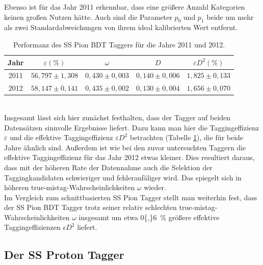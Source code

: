 Ebenso ist für das Jahr \num{2011} erkennbar, dass eine größere Anzahl Kategorien keinen großen Nutzen hätte. Auch sind die Parameter $p_0$ und $p_1$ beide um mehr als zwei Standardabweichungen von ihrem ideal kalibrierten Wert entfernt.
\begin{table}[htbp]
	\centering
	\caption{Performanz des SS Pion BDT Taggers für die Jahre \num{2011} und \num{2012}.}
	\label{tab:performance_SSPionBDT}
	\begin{tabular}{ccccc}
	\toprule
      Jahr & $\varepsilon(\%)$ & $\omega$ & $D$ & $\varepsilon D^2(\%)$ \\ 
      \midrule
      2011 & $56{,}797\pm1{,}308$& $0{,}430\pm0{,}003$ & $0{,}140\pm0{,}006$ & $1{,}825\pm0{,}133$\\ 
      2012 & $58{,}147\pm0{,}141$& $0{,}435\pm0{,}002$ & $0{,}130\pm0{,}004$ & $1{,}656\pm0{,}070$\\ 
      \bottomrule
	\end{tabular}
\end{table}\\
Insgesamt lässt sich hier zunächst festhalten, dass der Tagger auf beiden Datensätzen sinnvolle Ergebnisse liefert. Dazu kann man hier die Taggingeffizienz $\varepsilon$ und die effektive Taggingeffizienz $\varepsilon D^2$ betrachten (Tabelle \ref{tab:performance_SSPionBDT}), die für beide Jahre ähnlich sind. Außerdem ist wie bei den zuvor untersuchten Taggern die effektive Taggingeffizienz für das Jahr \num{2012} etwas kleiner. Dies resultiert daraus, dass mit der höheren Rate der Datennahme auch die Selektion der Taggingkandidaten schwieriger und fehleranfäliger wird. Das spiegelt sich in höheren true-mistag-Wahrscheinlichkeiten $\omega$ wieder.\\
Im Vergleich zum schnittbasierten SS Pion Tagger stellt man weiterhin fest, dass der SS Pion BDT Tagger trotz seiner relativ schlechten true-mistag-Wahrscheinlichkeiten $\omega$ insgesamt um etwa \SI{0{,}6}{\%} größere effektive Taggingeffizienzen $\epsilon D^2$ liefert. 

\subsection{Der SS Proton Tagger}

